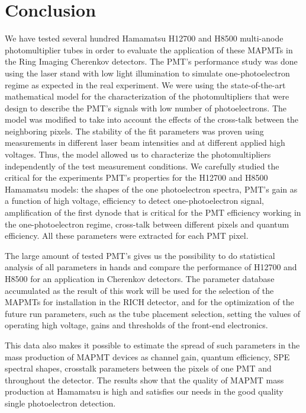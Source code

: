 \section{Conclusion}
We have tested several hundred Hamamatsu H12700 and H8500 multi-anode photomultiplier tubes in order to evaluate the application of these MAPMTs in the Ring Imaging Cherenkov detectors. The PMT’s performance study was done using the laser stand with low light illumination to simulate one-photoelectron regime as expected in the real experiment. We were using the state-of-the-art mathematical model for the characterization of the photomultipliers that were design to describe the PMT’s signals with low number of photoelectrons. 
The model was modified to take into account the effects of the cross-talk between the neighboring pixels. 
The stability of the fit parameters was proven using measurements in different laser beam intensities and at different applied high voltages. Thus, the model allowed us to characterize the photomultipliers independently of the test measurement conditions.
We carefully studied the critical for the experiments PMT's properties for the H12700 and H8500 Hamamatsu models:
the shapes of the one photoelectron spectra,
PMT's gain as a function of high voltage,
efficiency to detect one-photoelectron signal,
amplification of the first dynode that is critical for the PMT efficiency working in the one-photoelectron regime,
cross-talk between different pixels and
quantum efficiency. All these parameters were extracted for each PMT pixel.

The large amount of tested  PMT’s gives us the possibility to do statistical analysis of all parameters in hands and compare the performance of H12700 and H8500 for an application in Cherenkov detectors. The parameter database accumulated as the result of this work will be used for the selection of the MAPMTs for installation in the RICH detector, and for the optimization of the future run parameters, such as the tube placement selection, setting the values of operating high voltage, gains and thresholds of the front-end electronics. 

This data also makes it possible to estimate the spread of such parameters in the mass production of MAPMT devices as channel gain, quantum efficiency, SPE spectral shapes, crosstalk parameters between the pixels of one PMT and throughout the detector.
The results show that the quality of MAPMT mass production at Hamamatsu is high and satisfies our needs in the good quality single photoelectron detection.
 


